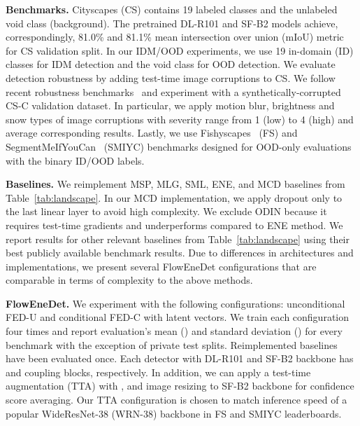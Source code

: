 \documentclass[accepted, startpage]{uai2023}
\begin{document}
\textbf{Benchmarks.} Cityscapes (CS) contains 19 labeled classes and the unlabeled void class (background). The pretrained DL-R101 and SF-B2 models achieve, correspondingly, 81.0\% and 81.1\% mean intersection over union (mIoU) metric for CS validation split. In our IDM/OOD experiments, we use 19 in-domain (ID) classes for IDM detection and the void class for OOD detection. We evaluate detection robustness by adding test-time image corruptions to CS. We follow recent robustness benchmarks~\citep{croce2021robustbench, michaelis2020benchmarking} and experiment with a synthetically-corrupted CS-C validation dataset. In particular, we apply motion blur, brightness and snow types of image corruptions with severity range from 1 (low) to 4 (high) and average corresponding results. Lastly, we use Fishyscapes~\citep{fishyscapes} (FS) and SegmentMeIfYouCan~\citep{segmentmeifyoucan} (SMIYC) benchmarks designed for OOD-only evaluations with the binary ID/OOD labels.

\textbf{Baselines.} We reimplement MSP, MLG, SML, ENE, and MCD baselines from Table~\ref{tab:landscape}. In our MCD implementation, we apply dropout only to the last linear layer to avoid high complexity. We exclude ODIN because it requires test-time gradients and underperforms compared to ENE method. We report results for other relevant baselines from Table~\ref{tab:landscape} using their best publicly available benchmark results. Due to differences in architectures and implementations, we present several FlowEneDet configurations that are comparable in terms of complexity to the above methods.

\textbf{FlowEneDet.} We experiment with the following configurations: unconditional FED-U and conditional FED-C with  latent vectors. We train each configuration four times and report evaluation's mean () and standard deviation () for every benchmark with the exception of private test splits. Reimplemented baselines have been evaluated once. Each detector with DL-R101 and SF-B2 backbone has  and  coupling blocks, respectively. In addition, we can apply a test-time augmentation (TTA) with ,  and  image resizing to SF-B2 backbone for confidence score averaging. Our TTA configuration is chosen to match inference speed of a popular WideResNet-38 (WRN-38) backbone in FS and SMIYC leaderboards.
\end{document}
